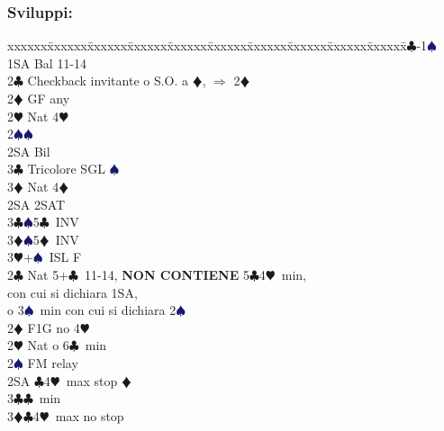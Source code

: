 \documentclass[a4paper,italian]{article}
\newcommand{\BC}{\textcolor{OliveGreen}{$\clubsuit$}}
\newcommand{\BD}{\textcolor{RedOrange}{$\vardiamondsuit$}}
\newcommand{\BH}{\textcolor{Red2}{$\varheartsuit${}}}
\newcommand{\BS}{\textcolor{MidnightBlue}{$\spadesuit${}}}
\newenvironment{bidtable}
{\begin{tabbing}

    xxxxxx\=xxxxxx\=xxxxxx\=xxxxxx\=xxxxxx\=xxxxxx\=xxxxxx\=xxxxxx\=xxxxxx\=xxxxxx\=\kill}
{\end{tabbing} }%
\begin{document}
\begin{multicols}{2}
                                    \subsubsection{Sviluppi:}

                                    \begin{bidtable}
                                        1\BC-1\BS\+\\
                                        1SA \> Bal 11-14\+\\
                                        2\BC \> Checkback invitante o S.O. a \BD , $\Rightarrow$ 2\BD \\
                                        2\BD \> GF any\+\\
                                        2\BH \> Nat 4\BH \\
                                        2\BS {}\BS \\
                                        2SA \> Bil\\
                                        3\BC \> Tricolore SGL \BS \\
                                        3\BD \> Nat 4\BD \-\\
                                        2SA \> 2SAT\\
                                        3\BC {}\BS 5\BC\ INV\\
                                        3\BD {}\BS 5\BD\ INV\\
                                        3\BH {}+\BS\ ISL F\-\\
                                        2\BC \> Nat 5+\BC\ 11-14, \textbf{NON CONTIENE} 5\BC 4\BH\ min,\+\\ con cui si dichiara 1SA,\\ o 3\BS\ min con cui si dichiara 2\BS\\
                                        2\BD \> F1G no 4\BH \+\\
                                        2\BH \> Nat o 6\BC\ min\+\\
                                        2\BS \> FM relay\+\\
                                        2SA \BC 4\BH\ max stop \BD \\
                                        3\BC {}\BC\ min\\
                                        3\BD {}\BC 4\BH\ max no stop\\

\end{bidtable}
\end{multicols}
\end{document}
